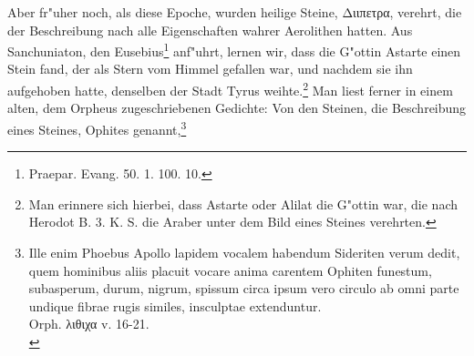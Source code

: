 \documentclass[a4paper, 11pt, oneside, polutonikogreek, german]{article}
\begin{document}
Aber fr"uher noch, als diese Epoche, wurden heilige Steine, Διιπετρα, verehrt, die der Beschreibung nach alle Eigenschaften wahrer Aerolithen hatten. Aus Sanchuniaton, den Eusebius\footnote{Praepar. Evang. 50. 1. 100. 10.} anf"uhrt, lernen wir, dass die G"ottin Astarte einen Stein fand, der als Stern vom Himmel gefallen war, und nachdem sie ihn aufgehoben hatte, denselben der Stadt Tyrus weihte.\footnote{Man erinnere sich hierbei, dass Astarte oder Alilat die G"ottin war, die nach Herodot B. 3. K. S. die Araber unter dem Bild eines Steines verehrten.} Man liest ferner in einem alten, dem Orpheus zugeschriebenen Gedichte: Von den Steinen, die Beschreibung eines Steines, Ophites genannt,\footnote{Ille enim Phoebus Apollo lapidem vocalem habendum Sideriten verum dedit, quem hominibus aliis placuit vocare anima carentem Ophiten funestum, subasperum, durum, nigrum, spissum circa ipsum vero circulo ab omni parte undique fibrae rugis similes, insculptae extenduntur.\\
Orph. λιθιχα v. 16-21.\\
}
\end{document}
